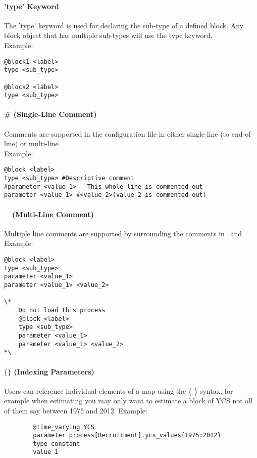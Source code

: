 \paragraph*{'type' Keyword}
The 'type' keyword is used for declaring the sub-type of a defined block. Any block object that has multiple sub-types will use the type keyword.\\
Example:
{\small{\begin{verbatim}
@block1 <label>
type <sub_type>

@block2 <label>
type <sub_type>
\end{verbatim}}}

\paragraph*{\# (Single-Line Comment)}
Comments are supported in the configuration file in either single-line (to end-of-line) or multi-line\\
Example:
{\small{\begin{verbatim}
@block <label>
type <sub_type> #Descriptive comment
#parameter <value_1> – This whole line is commented out
parameter <value_1> #<value_2>(value_2 is commented out)
\end{verbatim}}}

\paragraph*{\commentstart\ \commentend\ (Multi-Line Comment)}
Multiple line comments are supported by surrounding the comments in \commentstart\ and \commentend\\
Example:
{\small{\begin{verbatim}
@block <label>
type <sub_type>
parameter <value_1>
parameter <value_1> <value_2>

\* 
	Do not load this process
	@block <label>
	type <sub_type>
	parameter <value_1>
	parameter <value_1> <value_2>
*\
\end{verbatim}}}

\paragraph*{$\{ \}$ (Indexing Parameters)}

Users can reference individual elements of a map using the \{ \} syntax, for example when estimating  you may only want to estimate a block of YCS not all of them say between 1975 and 2012.
Example:
{\small{\begin{verbatim}
		@time_varying YCS
		parameter process[Recruitment].ycs_values{1975:2012}
		type constant
		value 1
\end{verbatim}}}
	
